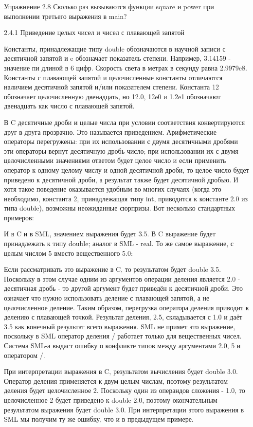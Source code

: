Упражнение 2.8 Сколько раз вызываются функции square и power при выполнении третьего выражения в main?

2.4.1 Приведение целых чисел и чисел с плавающей запятой

Константы, принадлежащие типу double обозначаются в научной записи с десятичной запятой и e обозначает показатель степени. Например, 3.14159 - значение пи длиной в 6 цифр. Скорость света в метрах в секунду равна 2.9979e8. Константы с плавающей запятой и целочисленные константы отличаются наличием десятичной запятой и/или показателем степени. Константа 12 обозначает целочисленную двенадцать, но 12.0, 12e0 и 1.2e1 обозначают двенадцать как число с плавающей запятой.

В C десятичные дроби и целые числа при условии соответствия конвертируются друг в друга прозрачно. Это называется приведением. Арифметические операторы перегружены: при их использовании с двумя десятичными дробями эти операторы вернут десятичную дробь число; при использовании их с двумя целочисленными значениями ответом будет целое число и если применить оператор к одному целому числу и одной десятичной дроби, то целое число будет приведено к десятичной дроби, а результат также будет десятичной дробью. И хотя такое поведение оказывается удобным во многих случаях (когда это необходимо, константа 2, принадлежащая типу int, приводится к константе 2.0 из типа double), возможны неожиданные сюрпризы. Вот несколько стандартных примеров:

И в C и в SML, значением выражения будет 3.5. В C выражение будет принадлежать к типу double; аналог в SML - real. То же самое выражение, с целым числом 5 вместо вещественного 5.0:

Если рассматривать это выражение в C, то результатом будет double 3.5. Поскольку в этом случае одним из аргументов операции деления является 2.0 - десятичная дробь - то другой аргумент будет приведён к десятичной дроби. Это означает что нужно использовать деление с плавающей запятой, а не целочисленное деление. Таким образом, перегрузка оператора деления приводит к делению с плавающей точкой. Результат деления, 2.5, складывается с 1.0 и даёт 3.5 как конечный результат всего выражения. SML не примет это выражение, поскольку в SML оператор деления / работает только для вещественных чисел. Система SML-а выдаст ошибку о конфликте типов между аргументами 2.0, 5 и оператором /.

При интерпретации выражения в C, результатом вычисления будет double 3.0. Оператор деления применяется к двум целым числам, поэтому результатом деления будет целочисленное 2. Поскольку один из операндов сложения - 1.0, то целочисленное 2 будет приведено к double 2.0, поэтому окончательным результатом выражения будет double 3.0. При интерпретации этого выражения в SML мы получим ту же ошибку, что и в предыдущем  примере.

